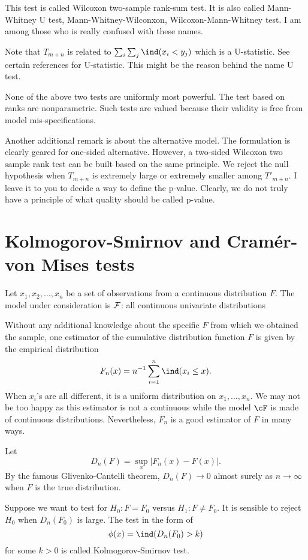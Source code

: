 This test is called Wilcoxon two-sample rank-sum test.
It is also called Mann-Whitney U test, Mann-Whitney-Wilconxon, 
Wilcoxon-Mann-Whitney test.
I am among those who is really confused with these names.

Note that $T_{m+n}$ is related to $\sum_i \sum_j \ind (x_i < y_j)$
which is a U-statistic. See certain references for U-statistic.
This might be the reason behind the name U test.

None of the above two tests are uniformly most powerful.
The test based on ranks are nonparametric. Such tests are valued
because their validity is free from model mis-specifications.

Another additional remark is about the alternative model.
The formulation is clearly geared for one-sided alternative.
However, a two-sided Wilcoxon two sample rank test
can be built based on the same principle. We reject the null
hypothesis when $T_{m+n}$ is extremely large or extremely
smaller among $T'_{m+n}$.
I leave it to you to decide a way to define the p-value.
Clearly, we do not truly have a principle of what quality
should be called p-value.

\section{Kolmogorov-Smirnov and Cram\'er-von Mises tests}

Let $x_1, x_2, \ldots, x_n$ be a set of \iid observations
from a continuous distribution $F$. The model under consideration
is ${\cal F}$: all continuous univariate distributions 

Without any additional knowledge about the specific $F$ from
which we obtained the sample, one estimator of the
cumulative distribution function $F$ is given by
the empirical distribution
\[
F_n(x) = n^{-1} \sum_{i=1}^n \ind (x_i \leq x).
\]
When $x_i$'s are all different, it is a uniform distribution on $x_1, \ldots, x_n$.
We may not be too happy as this estimator is not a continuous
\cdf while the model $\cF$ is made of continuous distributions.
Nevertheless, $F_n$ is a good estimator of $F$ in many ways.

Let
\[
D_n(F) = \sup_x | F_n(x) - F(x) |.
\]
By the famous Glivenko-Cantelli theorem, $D_n(F) \to 0$ almost surely as $n \to \infty$
when $F$ is the true distribution.

Suppose we want to test for $H_0: F = F_0$ versus $H_1: F \neq F_0$.
It is sensible to reject $H_0$ when $D_n(F_0)$ is large.
The test in the form of
\[
\phi(x) = \ind ( D_n(F_0) > k )
\]
for some $k > 0$ is called Kolmogorov-Smirnov test.


